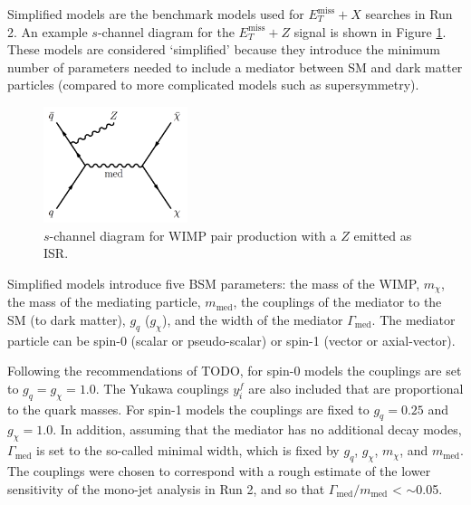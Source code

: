 Simplified models are the benchmark models used for $E_T^\text{miss}+X$ searches in Run 2. An example $s$-channel diagram for the $E_T^\text{miss}+Z$ signal is shown in Figure \ref{fig:simp}. These models are considered `simplified' because they introduce the minimum number of parameters needed to include a mediator between SM and dark matter particles (compared to more complicated models such as supersymmetry). 

\begin{figure}[htb]
\centering
\includegraphics[width=0.375\textwidth]{Figures/simp.png}
\caption{$s$-channel diagram for WIMP pair production with a $Z$ emitted as ISR.}
\label{fig:simp}
\end{figure}

Simplified models introduce five BSM parameters: the mass of the WIMP, $m_\chi$, the mass of the mediating particle, $m_\text{med}$, the couplings of the mediator to the SM (to dark matter), $g_q$ ($g_\chi$), and the width of the mediator $\Gamma_\text{med}$. The mediator particle can be spin-0 (scalar or pseudo-scalar) or spin-1 (vector or axial-vector). 




Following the recommendations of TODO, for spin-0 models the couplings are set to $g_q = g_\chi = 1.0$. The Yukawa couplings $y_i^f$ are also included that are proportional to the quark masses. For spin-1 models the couplings are fixed to $g_q = 0.25$ and $g_\chi = 1.0$. In addition, assuming that the mediator has no additional decay modes, $\Gamma_\text{med}$ is set to the so-called minimal width, which is fixed by $g_q$, $g_\chi$, $m_\chi$, and $m_\text{med}$. %
The couplings were chosen to correspond with a rough estimate of the lower sensitivity of the mono-jet analysis in Run 2, and so that $\Gamma_\text{med}/m_\text{med}$ < $\sim$0.05.

